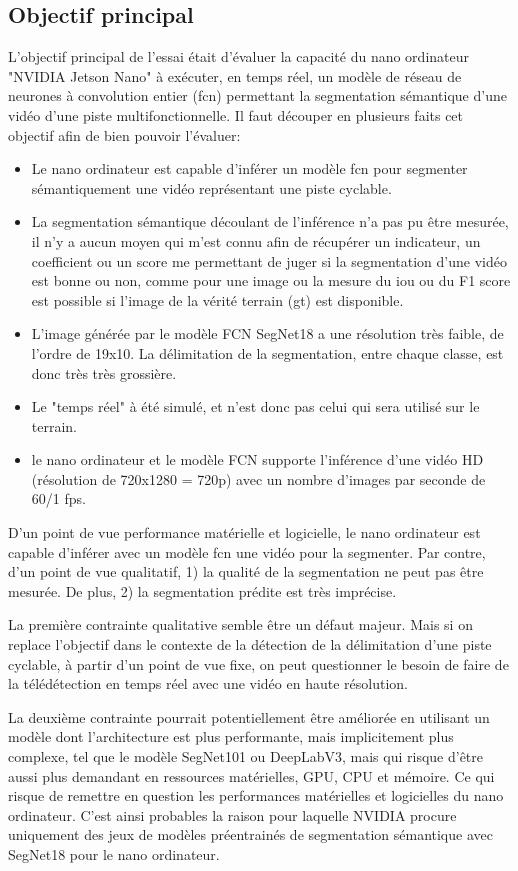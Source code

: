 ﻿\subsection{Objectif principal}
\par L'objectif principal de l'essai était d'évaluer la capacité du nano ordinateur "NVIDIA Jetson Nano" à exécuter, en temps réel, un modèle de réseau de neurones à convolution entier (\acrshort{fcn}) permettant la segmentation sémantique d'une vidéo d'une piste multifonctionnelle. Il faut découper en plusieurs faits cet objectif afin de bien pouvoir l'évaluer: 
\begin{itemize}
   \item Le nano ordinateur est capable d'inférer un modèle \acrshort{fcn} pour segmenter sémantiquement une vidéo représentant une piste cyclable. 
   \item La segmentation sémantique découlant de l'inférence n'a pas pu être mesurée, il n'y a aucun moyen qui m'est connu afin de récupérer un indicateur, un coefficient ou un score me permettant de juger si la segmentation d'une vidéo est bonne ou non, comme pour une image ou la mesure du \acrshort{iou} ou du F1 score est possible si l'image de la vérité terrain (\acrshort{gt}) est disponible. 
   \item L'image générée par le modèle FCN SegNet18 a une résolution très faible, de l'ordre de 19x10. La délimitation de la segmentation, entre chaque classe, est donc très très grossière.
   \item Le "temps réel" à été simulé, et n'est donc pas celui qui sera utilisé sur le terrain. 
   \item le nano ordinateur et le modèle FCN supporte l'inférence d'une vidéo HD (résolution de 720x1280 = 720p) avec un nombre d'images par seconde de 60/1 \acrshort{fps}.
\end{itemize}   
\par D'un point de vue performance matérielle et logicielle, le nano ordinateur est capable d'inférer avec un modèle \acrshort{fcn} une vidéo pour la segmenter. Par contre, d'un point de vue qualitatif, 1) la qualité de la segmentation ne peut pas être mesurée. De plus, 2) la segmentation prédite est très imprécise.
\par La première contrainte qualitative semble être un défaut majeur. Mais si on replace l'objectif dans le contexte de la détection de la délimitation d'une piste cyclable, à partir d'un point de vue fixe, on peut questionner le besoin de faire de la télédétection en temps réel avec une vidéo en haute résolution.
\par La deuxième  contrainte pourrait potentiellement être améliorée en utilisant un modèle dont l'architecture est plus performante, mais implicitement plus complexe, tel que le modèle SegNet101 ou DeepLabV3, mais qui risque d'être aussi plus demandant en ressources matérielles, GPU, CPU et mémoire. Ce qui risque de remettre en question les performances matérielles et logicielles du nano ordinateur. C'est ainsi probables la raison pour laquelle NVIDIA procure uniquement des jeux de modèles préentrainés de segmentation sémantique avec SegNet18 pour le nano ordinateur. 
